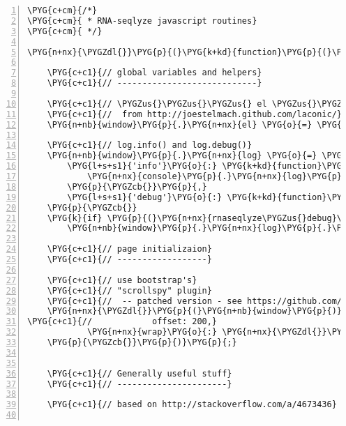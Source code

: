 \begin{Verbatim}[commandchars=\\\{\},numbers=left,firstnumber=1,stepnumber=5]
\PYG{c+cm}{/*}
\PYG{c+cm}{ * RNA-seqlyze javascript routines}
\PYG{c+cm}{ */}

\PYG{n+nx}{\PYGZdl{}}\PYG{p}{(}\PYG{k+kd}{function}\PYG{p}{(}\PYG{p}{)} \PYG{p}{\PYGZob{}}

    \PYG{c+c1}{// global variables and helpers}
    \PYG{c+c1}{// ----------------------------}

    \PYG{c+c1}{// \PYGZus{}\PYGZus{}\PYGZus{} el \PYGZus{}\PYGZus{}\PYGZus{}}
    \PYG{c+c1}{//  from http://joestelmach.github.com/laconic/}
    \PYG{n+nb}{window}\PYG{p}{.}\PYG{n+nx}{el} \PYG{o}{=} \PYG{n+nx}{\PYGZdl{}}\PYG{p}{.}\PYG{n+nx}{el}\PYG{p}{;}

    \PYG{c+c1}{// log.info() and log.debug()}
    \PYG{n+nb}{window}\PYG{p}{.}\PYG{n+nx}{log} \PYG{o}{=} \PYG{p}{\PYGZob{}}
        \PYG{l+s+s1}{'info'}\PYG{o}{:} \PYG{k+kd}{function}\PYG{p}{(}\PYG{p}{)} \PYG{p}{\PYGZob{}}
            \PYG{n+nx}{console}\PYG{p}{.}\PYG{n+nx}{log}\PYG{p}{.}\PYG{n+nx}{apply}\PYG{p}{(}\PYG{n+nx}{console}\PYG{p}{,} \PYG{n+nx}{arguments}\PYG{p}{)}\PYG{p}{;}
        \PYG{p}{\PYGZcb{}}\PYG{p}{,}
        \PYG{l+s+s1}{'debug'}\PYG{o}{:} \PYG{k+kd}{function}\PYG{p}{(}\PYG{p}{)} \PYG{p}{\PYGZob{}}\PYG{p}{\PYGZcb{}}
    \PYG{p}{\PYGZcb{}}
    \PYG{k}{if} \PYG{p}{(}\PYG{n+nx}{rnaseqlyze\PYGZus{}debug}\PYG{p}{)}
        \PYG{n+nb}{window}\PYG{p}{.}\PYG{n+nx}{log}\PYG{p}{.}\PYG{n+nx}{debug} \PYG{o}{=} \PYG{n+nb}{window}\PYG{p}{.}\PYG{n+nx}{log}\PYG{p}{.}\PYG{n+nx}{info}\PYG{p}{;}

    \PYG{c+c1}{// page initializaion}
    \PYG{c+c1}{// ------------------}

    \PYG{c+c1}{// use bootstrap's}
    \PYG{c+c1}{// "scrollspy" plugin}
    \PYG{c+c1}{//  -- patched version - see https://github.com/twitter/bootstrap/pull/3829}
    \PYG{n+nx}{\PYGZdl{}}\PYG{p}{(}\PYG{n+nb}{window}\PYG{p}{)}\PYG{p}{.}\PYG{n+nx}{scrollspy}\PYG{p}{(}\PYG{p}{\PYGZob{}}
\PYG{c+c1}{//            offset: 200,}
            \PYG{n+nx}{wrap}\PYG{o}{:} \PYG{n+nx}{\PYGZdl{}}\PYG{p}{(}\PYG{l+s+s1}{'\PYGZsh{}wrap'}\PYG{p}{)}\PYG{p}{[}\PYG{l+m+mi}{0}\PYG{p}{]}\PYG{p}{,}
    \PYG{p}{\PYGZcb{}}\PYG{p}{)}\PYG{p}{;}


    \PYG{c+c1}{// Generally useful stuff}
    \PYG{c+c1}{// ----------------------}

    \PYG{c+c1}{// based on http://stackoverflow.com/a/4673436}


\end{Verbatim}
